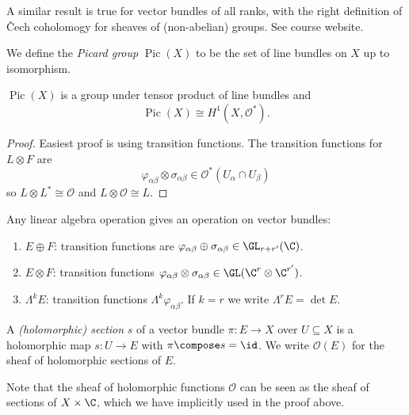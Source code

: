 \documentclass[a4paper]{article}
\DeclareMathOperator{\Pic}{Pic} %
\begin{document}
\begin{remark}
  A similar result is true for vector bundles of all ranks, with the right definition of Čech coholomogy for sheaves of (non-abelian) groups. See course website.
\end{remark}

\begin{definition}
  We define the \emph{Picard group} \(\Pic(X)\) to be the set of line bundles on \(X\) up to isomorphism.
\end{definition}

\begin{proposition}
  \(\Pic(X)\) is a group under tensor product of line bundles and
  \[
    \Pic(X) \cong H^1(X, \mathcal O^*).
  \]
\end{proposition}

\begin{proof}
  Easiest proof is using transition functions. The transition functions for \(L \otimes F\) are
  \[
    \varphi_{\alpha\beta} \otimes \sigma_{\alpha\beta} \in \mathcal O^*(U_\alpha \cap U_\beta)
  \]
  so \(L \otimes L^* \cong \mathcal O\) and \(L \otimes \mathcal O \cong L\).
\end{proof}

\begin{eg}
  Any linear algebra operation gives an operation on vector bundles:
  \begin{enumerate}
  \item \(E \oplus F\): transition functions are \(\varphi_{\alpha\beta} \oplus \sigma_{\alpha\beta} \in \GL_{r + r'}(\C)\).
  \item \(E \otimes F\): transition functions \(\varphi_{\alpha\beta} \otimes \sigma_{\alpha\beta} \in \GL(\C^r \otimes \C^{r'})\).
  \item \(\Lambda^kE\): transition functions \(\Lambda^k \varphi_{\alpha\beta}\). If \(k = r\) we write \(\Lambda^r E = \det E\).
  \end{enumerate}
\end{eg}

\begin{definition}[section]
  A \emph{(holomorphic) section} \(s\) of a vector bundle \(\pi: E \to X\) over \(U \subseteq X\) is a holomorphic map \(s: U \to E\) with \(\pi \compose s = \id\). We write \(\mathcal O(E)\) for the sheaf of holomorphic sections of \(E\).
\end{definition}

Note that the sheaf of holomorphic functions \(\mathcal O\) can be seen as the sheaf of sections of \(X \times \C\), which we have implicitly used in the proof above.
\end{document}
